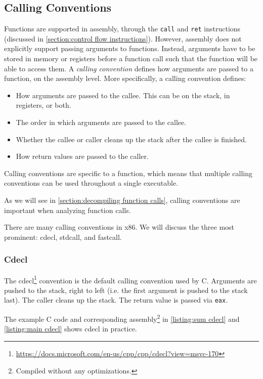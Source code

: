 \subsection{Calling Conventions}\label{section:calling conventions}
Functions are supported in assembly, through the \texttt{call} and \texttt{ret} instructions (discussed in \autoref{section:control flow instructions}). However, assembly does not explicitly support passing arguments to functions. Instead, arguments have to be stored in memory or registers before a function call such that the function will be able to access them. A \emph{calling convention} defines how arguments are passed to a function, on the assembly level. More specifically, a calling convention defines:
\begin{itemize}
    \item How arguments are passed to the callee. This can be on the stack, in registers, or both.
    \item The order in which arguments are passed to the callee.
    \item Whether the callee or caller cleans up the stack after the callee is finished.
    \item How return values are passed to the caller.
\end{itemize}

Calling conventions are specific to a function, which means that multiple calling conventions can be used throughout a single executable.

As we will see in \autoref{section:decompiling function calls}, calling conventions are important when analyzing function calls.

\medskip

There are many calling conventions in x86. We will discuss the three most prominent: cdecl, stdcall, and fastcall.

\subsubsection{Cdecl}\label{section:cdecl}
The cdecl\footnote{\tiny \url{https://docs.microsoft.com/en-us/cpp/cpp/cdecl?view=msvc-170}} convention is the default calling convention used by C. Arguments are pushed to the stack, right to left (i.e. the first argument is pushed to the stack last). The caller cleans up the stack. The return value is passed via \texttt{eax}.

The example C code and corresponding assembly\footnote{Compiled without any optimizations.} in \autoref{listing:sum cdecl} and \autoref{listing:main cdecl} shows cdecl in practice.

